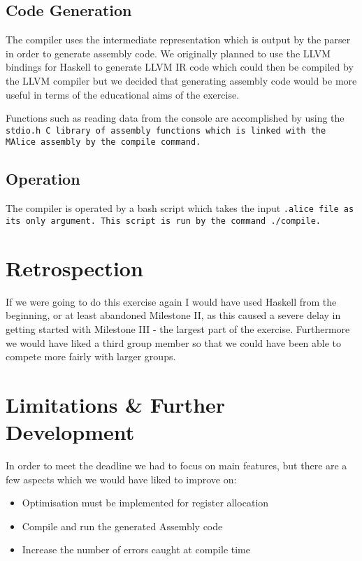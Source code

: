 \documentclass[11pt]{article}
\begin{document}
\subsection{Code Generation}
The compiler uses the intermediate representation which is output by the parser in order to generate assembly code. We originally planned to use the LLVM bindings for Haskell to generate LLVM IR code which could then be compiled by the LLVM compiler but we decided that generating assembly code would be more useful in terms of the educational aims of the exercise.

Functions such as reading data from the console are accomplished by using the \tt stdio.h \rm C library of assembly functions which is linked with the MAlice assembly by the \tt compile \rm command.

\subsection{Operation}
The compiler is operated by a bash script which takes the input \tt .alice \rm file as its only argument. This script is run by the command \tt ./compile\rm .

\section{Retrospection}
If we were going to do this exercise again I would have used Haskell from the beginning, or at least abandoned Milestone II, as this caused a severe delay in getting started with Milestone III - the largest part of the exercise. Furthermore we would have liked a third group member so that we could have been able to compete more fairly with larger groups.

\section{Limitations \& Further Development}
In order to meet the deadline we had to focus on main features, but there are a few aspects which we would have liked to improve on:

\begin{itemize}
\item Optimisation must be implemented for register allocation
\item Compile and run the generated Assembly code
\item Increase the number of errors caught at compile time
\end{itemize}
\end{document}
